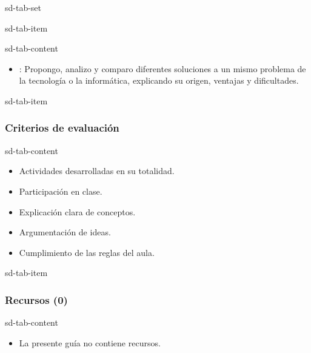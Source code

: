\documentclass[letterpaper,10pt,spanish]{sphinxmanual}
\begin{document}
\begin{sphinxuseclass}{sd-tab-set}
\begin{sphinxuseclass}{sd-tab-item}
\begin{sphinxuseclass}{sd-tab-content}
\begin{itemize}
\item {} 
\sphinxAtStartPar
{}: Propongo, analizo y comparo diferentes soluciones a un mismo problema de la tecnología o la informática, explicando su origen, ventajas y dificultades.

\end{itemize}

\end{sphinxuseclass}
\end{sphinxuseclass}
\begin{sphinxuseclass}{sd-tab-item}\subsubsection*{Criterios de evaluación}

\begin{sphinxuseclass}{sd-tab-content}\begin{itemize}
\item {} 
\sphinxAtStartPar
Actividades desarrolladas en su totalidad.

\item {} 
\sphinxAtStartPar
Participación en clase.

\item {} 
\sphinxAtStartPar
Explicación clara de conceptos.

\item {} 
\sphinxAtStartPar
Argumentación de ideas.

\item {} 
\sphinxAtStartPar
Cumplimiento de las reglas del aula.

\end{itemize}

\end{sphinxuseclass}
\end{sphinxuseclass}
\begin{sphinxuseclass}{sd-tab-item}\subsubsection*{Recursos (0)}

\begin{sphinxuseclass}{sd-tab-content}\begin{itemize}
\item {} 
\sphinxAtStartPar
La presente guía no contiene recursos.

\end{itemize}

\end{sphinxuseclass}
\end{sphinxuseclass}
\end{sphinxuseclass}
\end{document}
